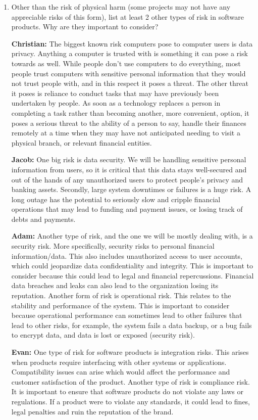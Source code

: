 \documentclass{article}
\begin{document}
\begin{enumerate}
    \item Other than the risk of physical harm (some projects may not have any
    appreciable risks of this form), list at least 2 other types of risk in
    software products. Why are they important to consider?

    \textbf{Christian:} The biggest known risk computers pose to computer users is data privacy. Anything a computer is trusted with is something it can pose a risk towards as well. While people don't use computers to do everything, most people trust computers with sensitive personal information that they would not trust people with, and in this respect it poses a threat. The other threat it poses is reliance to conduct tasks that may have previously been undertaken by people. As soon as a technology replaces a person in completing a task rather than becoming another, more convenient, option, it poses a serious threat to the ability of a person to say, handle their finances remotely at a time when they may have not anticipated needing to visit a physical branch, or relevant financial entities.

    \textbf{Jacob:} One big risk is data security. We will be handling sensitive personal information from users, so it is critical that this data stays well-secured and out of the hands of any unauthorized users to protect people's privacy and banking assets. Secondly, large system downtimes or failures is a huge risk. A long outage has the potential to seriously slow and cripple financial operations that may lead to funding and payment issues, or losing track of debts and payments.

    \textbf{Adam:} Another type of risk, and the one we will be mostly dealing with, is a security risk. More specifically, security risks to personal financial information/data. This also includes unauthorized access to user accounts, which could jeopardize data confidentiality and integrity. This is important to consider because this could lead to legal and financial repercussions. Financial data breaches and leaks can also lead to the organization losing its reputation. Another form of risk is operational risk. This relates to the stability and performance of the system. This is important to consider because operational performance can sometimes lead to other failures that lead to other risks, for example, the system fails a data backup, or a bug fails to encrypt data, and data is lost or exposed (security risk).

    \textbf{Evan:} One type of risk for software products is integration risks. This arises when products require interfacing with other systems or applications. Compatibility issues can arise which would affect the performance and customer satisfaction of the product. Another type of risk is compliance risk. It is important to ensure that software products do not violate any laws or regulations. If a product were to violate any standards, it could lead to fines, legal penalties and ruin the reputation of the brand.
    

\end{enumerate}
\end{document}

